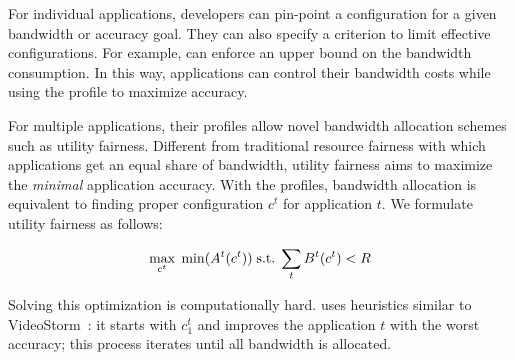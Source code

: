 For individual applications, developers can pin-point a configuration for a
given bandwidth or accuracy goal. They can also specify a criterion to limit
effective configurations. For example, \sysname{} can enforce an upper bound on
the bandwidth consumption. In this way, applications can control their bandwidth
costs while using the profile to maximize accuracy.

For multiple applications, their profiles allow novel bandwidth allocation
schemes such as utility fairness. Different from traditional resource fairness
with which applications get an equal share of bandwidth, utility fairness aims
to maximize the \textit{minimal} application accuracy. With the profiles,
bandwidth allocation is equivalent to finding proper configuration $c^t$ for
application $t$. We formulate utility fairness as follows:


\vspace{-0.5em}
\begin{equation}
  \vspace{-0.5em}
  \label{eq:multitask}
 \underset{c^t}{\max} \; \min({A^t(c^t)})
 \;
 \text{s.t.}
 \;
 \sum_t{B^t(c^t)} < R
\end{equation}


Solving this optimization is computationally hard. \sysname{} uses heuristics
similar to VideoStorm~\cite{zhang2017live}: it starts with $c^t_1$ and improves
the application $t$ with the worst accuracy; this process iterates until all
bandwidth is allocated.

